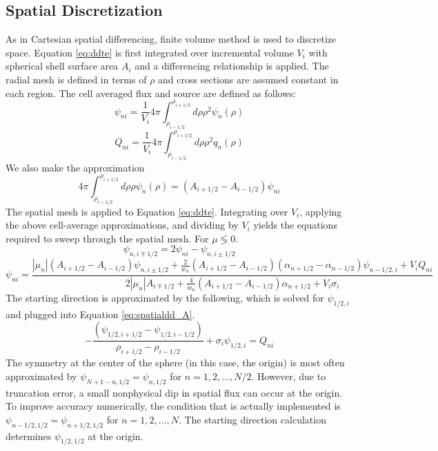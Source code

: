 \documentclass[11pt, oneside]{article}   	%
\begin{document}
\subsection{Spatial Discretization}

As in Cartesian spatial differencing, finite volume method is used to discretize space. Equation \ref{eq:ddte} is first integrated over incremental volume $V_i$ with spherical shell surface area $A_i$ and a differencing relationship is applied. The radial mesh is defined in terms of $\rho$ and cross sections are assumed constant in each region. The cell averaged flux and source are defined as follows:
%
\begin{equation}\label{cell_avg_flux_A}
\psi_{ni} = \frac{1}{V_i}4\pi\int_{\rho_{i-1/2}}^{\rho_{i+1/2}}{d\rho\rho^2\psi_n(\rho)}
\end{equation}
%
\begin{equation}\label{cell_avg_source}
Q_{ni} = \frac{1}{V_i}4\pi\int_{\rho_{i-1/2}}^{\rho_{i+1/2}}{d\rho\rho^2 q_n(\rho)}
\end{equation}
%
We also make the approximation
%
\begin{equation}\label{flux_over_area}
4\pi\int_{\rho_{i-1/2}}^{\rho_{i+1/2}}{d\rho\rho\psi_n(\rho)} = \left(A_{i+1/2}-A_{i-1/2}\right)\psi_{ni}
\end{equation}
%
The spatial mesh is applied to Equation \ref{eq:ddte}. Integrating over $V_i$, applying the above cell-average approximations, and dividing by $V_i$ yields the equations required to sweep through the spatial mesh. For $\mu \lessgtr 0$.
%
\begin{equation}
\psi_{n,i \mp 1/2}=2\psi_{ni} - \psi_{n,i \pm 1/2} 
\end{equation}
%
\begin{equation}\label{eq:spatialdd_A}
\psi_{ni} = \frac{\left| \mu_n \right| \left(A_{i+1/2}-A_{i-1/2}\right)\psi_{n,i \pm 1/2}+
\frac{2}{w_n}\left(A_{i+1/2}-A_{i-1/2}\right)\left(\alpha_{n+1/2}-\alpha_{n-1/2}\right)\psi_{n-1/2,i}+V_i Q_{ni}}
{2\left| \mu_n \right| A_{i \mp 1/2} + \frac{4}{w_n}\left(A_{i+1/2}-A_{i-1/2}\right)\alpha_{n+1/2}+V_i\sigma_i}
\end{equation}
%
The starting direction is approximated by the following, which is solved for $\psi_{1/2,i}$ and plugged into Equation \ref{eq:spatialdd_A}.
%
\begin{equation}
-\frac{\left(\psi_{1/2, i+1/2} - \psi_{1/2, i-1/2}\right)}{\rho_{i+1/2}-\rho_{i-1/2}}+\sigma_i\psi_{1/2,i}=Q_{ni}
\end{equation}
%
The symmetry at the center of the sphere (in this case, the origin) is most often approximated by $\psi_{N+1-n, 1/2} = \psi_{n,1/2}$ for $n=1, 2, \dots, N/2$. However, due to truncation error, a small nonphysical dip in spatial flux can occur at the origin. To improve accuracy numerically, the condition that is actually implemented is $\psi_{n-1/2, 1/2} = \psi_{n+1/2, 1/2}$ for $n=1, 2, \dots, N$. The starting direction calculation determines $\psi_{1/2, 1/2}$ at the origin.
\end{document}
